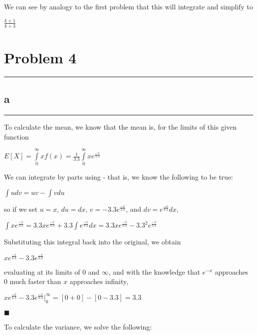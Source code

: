 \documentclass[]{tufte-handout}
\begin{document}
We can see by analogy to the first problem that this will integrate and
simplify to

\(\frac{k+1}{k+3}\)

\hypertarget{problem-4}{%
\section{Problem 4}\label{problem-4}}

\begin{center}\rule{0.5\linewidth}{0.5pt}\end{center}

\hypertarget{a-2}{%
\subsection{a}\label{a-2}}

\begin{center}\rule{0.5\linewidth}{0.5pt}\end{center}

To calculate the mean, we know that the mean is, for the limits of this
given function

\(E[X] = \int\limits^\infty_{0}xf(x) = \frac{1}{3.3}\int\limits^\infty_{0}xe^{\frac{-x}{3.3}}\)

We can integrate by parts using - that is, we know the following to be
true:

\(\int udv = uv - \int vdu\)

so if we set \(u = x\), \(du = dx\), \(v = -3.3e^{\frac{-x}{3.3}}\), and
\(dv = e^{\frac{-x}{3.3}}dx\),

\(\int xe^{\frac{-x}{3.3}}= 3.3xe^{\frac{-x}{3.3}} + 3.3\int e^{\frac{-x}{3.3}}dx = 3.3xe^{\frac{-x}{3.3}} - 3.3^2e^{\frac{-x}{3.3}}\)

Substituting this integral back into the original, we obtain

\(xe^{\frac{-x}{3.3}} - 3.3e^{\frac{-x}{3.3}}\)

evaluating at its limits of \(0\) and \(\infty\), and with the knowledge
that \(e^{-x}\) approaches 0 much faster than \(x\) approaches infinity,

\(xe^{\frac{-x}{3.3}} - 3.3e^{\frac{-x}{3.3}}\Big|^\infty_0 = [0 + 0] - [0 - 3.3] = 3.3\)

\begin{marginfigure}
\(\blacksquare\)
\end{marginfigure}

To calculate the variance, we solve the following:
\end{document}
